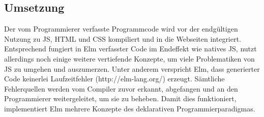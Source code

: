 \subsection{Umsetzung}
\label{sec:Umsetzung}
Der vom Programmierer verfasste Programmcode wird vor der endgültigen Nutzung zu \ac{JS}, \ac{HTML} und \ac{CSS} kompiliert und in die Webseiten integriert. Entsprechend fungiert in Elm verfasster Code im Endeffekt wie natives \ac{JS}, nutzt allerdings noch einige weitere vertiefende Konzepte, um viele Problematiken von \ac{JS} zu umgehen und auszumerzen.
Unter anderem verspricht Elm, dass generierter Code keinerlei Laufzeitfehler (http://elm-lang.org/) erzeugt. Sämtliche Fehlerquellen werden vom Compiler zuvor erkannt, abgefangen und an den Programmierer weitergeleitet, um sie zu beheben. Damit dies funktioniert, implementiert Elm mehrere Konzepte des deklarativen Programmierparadigmas.

